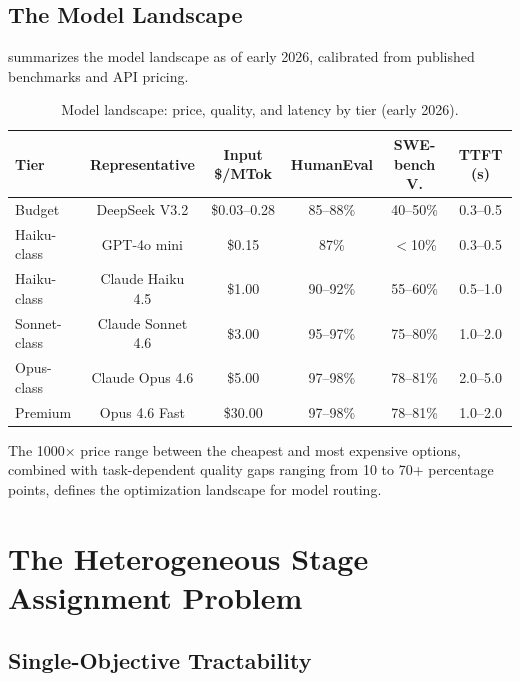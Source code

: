 \documentclass[11pt, a4paper, copyright]{googledeepmind}
\begin{document}
\subsection{The Model Landscape}

 summarizes the model landscape as of early 2026, calibrated from published benchmarks and API pricing.

\begin{table}[htbp]
\centering
\caption{Model landscape: price, quality, and latency by tier (early 2026).}
\label{tab:landscape}
\begin{tabular}{lccccc}
\toprule
\textbf{Tier} & \textbf{Representative} & \textbf{Input \$/MTok} & \textbf{HumanEval} & \textbf{SWE-bench V.} & \textbf{TTFT (s)} \\
\midrule
Budget & DeepSeek V3.2 & \$0.03--0.28 & 85--88\% & 40--50\% & 0.3--0.5 \\
Haiku-class & GPT-4o mini & \$0.15 & 87\% & $<$10\% & 0.3--0.5 \\
Haiku-class & Claude Haiku 4.5 & \$1.00 & 90--92\% & 55--60\% & 0.5--1.0 \\
Sonnet-class & Claude Sonnet 4.6 & \$3.00 & 95--97\% & 75--80\% & 1.0--2.0 \\
Opus-class & Claude Opus 4.6 & \$5.00 & 97--98\% & 78--81\% & 2.0--5.0 \\
Premium & Opus 4.6 Fast & \$30.00 & 97--98\% & 78--81\% & 1.0--2.0 \\
\bottomrule
\end{tabular}
\end{table}

The 1000$\times$ price range between the cheapest and most expensive options, combined with task-dependent quality gaps ranging from 10 to 70+ percentage points, defines the optimization landscape for model routing.


\section{The Heterogeneous Stage Assignment Problem}
\label{sec:assignment}

\subsection{Single-Objective Tractability}
\end{document}
